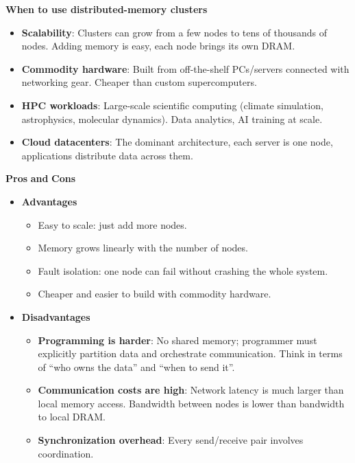 \highspace
\begin{flushleft}
    \textcolor{Green3}{ \textbf{When to use distributed-memory clusters}}
\end{flushleft}
\begin{itemize}
    \item \textbf{Scalability}: Clusters can grow from a few nodes to tens of thousands of nodes. Adding memory is easy, each node brings its own DRAM.
    \item \textbf{Commodity hardware}: Built from off-the-shelf PCs/servers connected with networking gear. Cheaper than custom supercomputers.
    \item \textbf{HPC workloads}: Large-scale scientific computing (climate simulation, astrophysics, molecular dynamics). Data analytics, AI training at scale.
    \item \textbf{Cloud datacenters}: The dominant architecture, each server is one node, applications distribute data across them.
\end{itemize}

\highspace
\begin{flushleft}
    \textcolor{Green3}{ \textbf{Pros}} \textbf{and} \textcolor{Red2}{ \textbf{Cons}}
\end{flushleft}
\begin{itemize}
    \item[\textcolor{Green3}{\faIcon{check-circle}}] \textcolor{Green3}{\textbf{Advantages}}
    \begin{itemize}
        \item[\textcolor{Green3}{\faIcon{check}}] Easy to scale: just add more nodes.
        \item[\textcolor{Green3}{\faIcon{check}}] Memory grows linearly with the number of nodes.
        \item[\textcolor{Green3}{\faIcon{check}}] Fault isolation: one node can fail without crashing the whole system.
        \item[\textcolor{Green3}{\faIcon{check}}] Cheaper and easier to build with commodity hardware.
    \end{itemize}
    \item[\textcolor{Red2}{\faIcon{times-circle}}] \textcolor{Red2}{\textbf{Disadvantages}}
    \begin{itemize}
        \item \textbf{Programming is harder}: No shared memory; programmer must explicitly partition data and orchestrate communication. Think in terms of ``who owns the data'' and ``when to send it''.
        \item \textbf{Communication costs are high}: Network latency is much larger than local memory access. Bandwidth between nodes is lower than bandwidth to local DRAM.
        \item \textbf{Synchronization overhead}: Every send/receive pair involves coordination.
    \end{itemize}
\end{itemize}